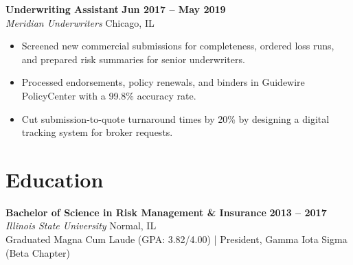 \documentclass[10pt,letterpaper]{article}
\begin{document}
\noindent
\textbf{Underwriting Assistant} \hfill \textbf{Jun 2017 -- May 2019} \\
\textit{Meridian Underwriters} \hfill Chicago, IL
\begin{itemize}[topsep=2pt, itemsep=2pt]
    \item Screened new commercial submissions for completeness, ordered loss runs, and prepared risk summaries for senior underwriters.
    \item Processed endorsements, policy renewals, and binders in Guidewire PolicyCenter with a 99.8\% accuracy rate.
    \item Cut submission-to-quote turnaround times by 20\% by designing a digital tracking system for broker requests.
\end{itemize}

\vspace{0.8em}

\section*{Education}
\noindent
\textbf{Bachelor of Science in Risk Management \& Insurance} \hfill \textbf{2013 -- 2017} \\
\textit{Illinois State University} \hfill Normal, IL \\
Graduated Magna Cum Laude (GPA: 3.82/4.00) \quad | \quad President, Gamma Iota Sigma (Beta Chapter)
\end{document}
